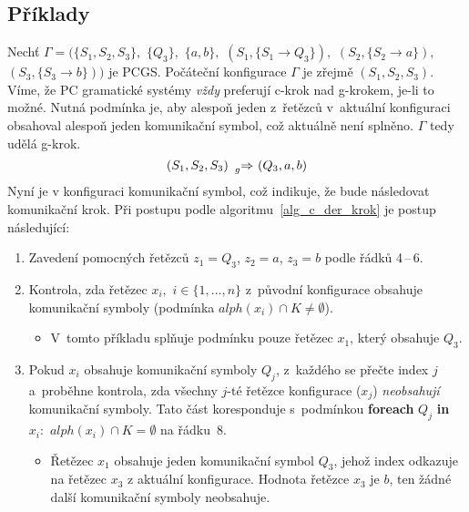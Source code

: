 \subsection*{Příklady}\label{PCGS_priklady}

\begin{example}
    Nechť $\Gamma = (\{S_1, S_2, S_3\},$ $\{Q_3\},$ $\{a, b\},$ $(S_1, \{S_1 \rightarrow Q_3\}),$ $(S_2, \{S_2 \rightarrow a\}),$ $(S_3, \{S_3 \rightarrow b\}))$ je PCGS.
    Počáteční konfigurace $\Gamma$ je zřejmě $(S_1, S_2, S_3)$.
    Víme, že PC gramatické systémy \emph{vždy} preferují c-krok nad g-krokem, je-li to možné.
    Nutná podmínka je, aby alespoň jeden z~řetězců v~aktuální konfiguraci obsahoval alespoň jeden komunikační symbol, což aktuálně není splněno.
    $\Gamma$ tedy udělá g-krok.
     \begin{equation*}
    (S_1, S_2, S_3) \ \prescript{}{g}{\Rightarrow} \ (Q_3, a, b)
     \end{equation*}
     Nyní je v konfiguraci komunikační symbol, což indikuje, že bude následovat komunikační krok.
     Při postupu podle algoritmu~\ref{alg_c_der_krok} je postup následující:
     \begin{enumerate}
        \item Zavedení pomocných řetězců $z_1 = Q_3$, $z_2 = a$, $z_3 = b$ podle řádků 4\,--\,6.
        \item Kontrola, zda řetězec $x_i,$ $i \in \{1, \ldots, n\}$ z~původní konfigurace obsahuje komunikační symboly (podmínka $alph(x_i) \cap K \neq \emptyset$).
        \begin{itemize}[label=$\circ$]
            \item V~tomto příkladu splňuje podmínku pouze řetězec $x_1$, který obsahuje $Q_3$.
        \end{itemize}
        \item Pokud $x_i$ obsahuje komunikační symboly $Q_j$, z~každého se přečte index $j$ a~proběhne kontrola, zda všechny $j$-té řetězce konfigurace ($x_j$) \emph{neobsahují} komunikační symboly.
        Tato část koresponduje s~podmínkou \textbf{foreach} $Q_j$ \textbf{in} $x_i:$ $alph(x_i) \cap K = \emptyset$ na řádku~8.
        \begin{itemize}[label=$\circ$]
            \item Řetězec $x_1$ obsahuje jeden komunikační symbol $Q_3$, jehož index odkazuje na řetězec $x_3$ z aktuální konfigurace. Hodnota řetězce $x_3$ je $b$, ten žádné další komunikační symboly neobsahuje.
        \end{itemize}

\end{enumerate}
\end{example}
